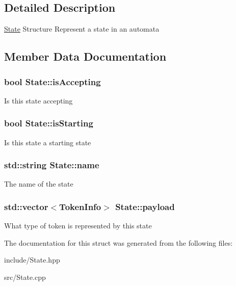 \subsection{Detailed Description}
\hyperlink{structState}{State} Structure Represent a state in an automata 

\subsection{Member Data Documentation}
\subsubsection[{\texorpdfstring{is\+Accepting}{isAccepting}}]{\setlength{\rightskip}{0pt plus 5cm}bool State\+::is\+Accepting}\hypertarget{structState_ab48af65a07f9ae4dfb880bacfbd2e812}{}\label{structState_ab48af65a07f9ae4dfb880bacfbd2e812}
Is this state accepting 
\subsubsection[{\texorpdfstring{is\+Starting}{isStarting}}]{\setlength{\rightskip}{0pt plus 5cm}bool State\+::is\+Starting}\hypertarget{structState_a578fb1731639aab7ee201241ac00b728}{}\label{structState_a578fb1731639aab7ee201241ac00b728}
Is this state a starting state 
\subsubsection[{\texorpdfstring{name}{name}}]{\setlength{\rightskip}{0pt plus 5cm}std\+::string State\+::name}\hypertarget{structState_ad57f19fd0a86f129840d8739253d2c72}{}\label{structState_ad57f19fd0a86f129840d8739253d2c72}
The name of the state 
\subsubsection[{\texorpdfstring{payload}{payload}}]{\setlength{\rightskip}{0pt plus 5cm}std\+::vector$<${\bf Token\+Info}$>$ State\+::payload}\hypertarget{structState_a19ea4225f19a3281e2d6c890b0c09312}{}\label{structState_a19ea4225f19a3281e2d6c890b0c09312}
What type of token is represented by this state 

The documentation for this struct was generated from the following files\+:\begin{DoxyCompactItemize}
\item 
include/State.\+hpp\item 
src/State.\+cpp\end{DoxyCompactItemize}
